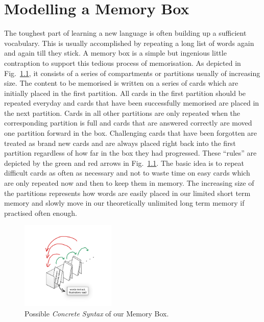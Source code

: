 \chapter{Modelling a Memory Box}
\label{chap:membox}

 The toughest part of learning a new language  is often building up a sufficient
vocabulary.  This is usually accomplished by repeating a long list of words
again and again till they stick.  A memory box is a simple but ingenious little
contraption to support this tedious process of memorisation.  As depicted in
Fig.~\ref{fig:membox_illustration}, it consists of a series of compartments or
partitions usually of increasing size.  The content to be memorised is written
on a series of cards  which are initially placed in the first partition.  All
cards in the first  partition should be repeated everyday and cards that have
been successfully  memorised are placed in the next partition.  Cards in all
other partitions are  only repeated when the corresponding partition is full and
cards that are  answered correctly are moved one partition forward in the box. 
Challenging  cards that have been forgotten are treated as brand new cards and
are always  placed right back into the first partition regardless of how far in
the box they  had progressed.  These ``rules'' are depicted by the green and red
arrows in  Fig.~\ref{fig:membox_illustration}. The basic idea is to repeat
difficult cards as often as necessary  and not to waste time on easy cards which
are only repeated now and then to keep them in memory.  The  increasing size of
the partitions represents how words are easily placed in our limited short term
memory and slowly move in our theoretically unlimited long term memory if
practised often enough.
 
\begin{figure}[htp]
\begin{center}
  \includegraphics[width=0.4\textwidth]{pics/installationAndSetup/membox_illustration}
  \caption[]{Possible \emph{Concrete Syntax} of our Memory Box.}
  \label{fig:membox_illustration}
\end{center}
\end{figure}

